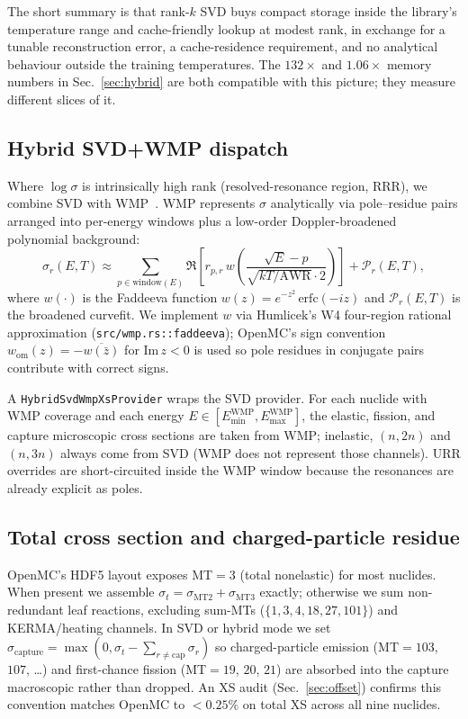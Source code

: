 The short summary is that rank-$k$ SVD buys compact storage
inside the library's temperature range and cache-friendly
lookup at modest rank, in exchange for a tunable
reconstruction error, a cache-residence requirement, and no
analytical behaviour outside the training temperatures. The
$132\times$ and $1.06\times$ memory numbers in
Sec.~\ref{sec:hybrid} are both compatible with this picture;
they measure different slices of it.

\subsection{Hybrid SVD+WMP dispatch}

Where $\log \sigma$ is intrinsically high rank
(resolved-resonance region, RRR), we combine SVD with
WMP~\cite{josey2015wmp,forget2014wmp}. WMP represents $\sigma$
analytically via pole--residue pairs arranged into per-energy
windows plus a low-order Doppler-broadened polynomial
background:
\begin{equation}
\sigma_r(E, T) \approx \sum_{p \in \text{window}(E)}
\Re\!\left[
r_{p,r}\,
w\!\left(\frac{\sqrt{E} - p}{\sqrt{kT/\text{AWR}}\cdot 2}\right)
\right] + \mathcal{P}_r(E, T),
\end{equation}
where $w(\cdot)$ is the Faddeeva function
$w(z) = e^{-z^2}\,\mathrm{erfc}(-iz)$ and $\mathcal{P}_r(E, T)$
is the broadened curvefit. We implement $w$ via Humlicek's W4
four-region rational approximation
(\texttt{src/wmp.rs::faddeeva}); OpenMC's sign convention
$w_\text{om}(z) = -\overline{w(\bar z)}$ for
$\mathrm{Im}\,z < 0$ is used so pole residues in conjugate
pairs contribute with correct signs.

A \texttt{HybridSvdWmpXsProvider} wraps the SVD provider. For
each nuclide with WMP coverage and each energy $E \in
[E_\text{min}^\text{WMP}, E_\text{max}^\text{WMP}]$, the
elastic, fission, and capture microscopic cross sections are
taken from WMP; inelastic, $(n,2n)$ and $(n,3n)$ always come
from SVD (WMP does not represent those channels). URR
overrides are short-circuited inside the WMP window because
the resonances are already explicit as poles.

\subsection{Total cross section and charged-particle residue}
\label{sec:total_xs}

OpenMC's HDF5 layout exposes MT$=3$ (total nonelastic) for
most nuclides. When present we assemble $\sigma_t =
\sigma_\text{MT2} + \sigma_\text{MT3}$ exactly; otherwise we
sum non-redundant leaf reactions, excluding sum-MTs
($\{1, 3, 4, 18, 27, 101\}$) and KERMA/heating channels. In
SVD or hybrid mode we set $\sigma_\text{capture} = \max(0,
\sigma_t - \sum_{r \neq \text{cap}} \sigma_r)$ so
charged-particle emission (MT$=103$, $107$, \ldots) and
first-chance fission (MT$=19$, $20$, $21$) are absorbed into
the capture macroscopic rather than dropped. An XS audit
(Sec.~\ref{sec:offset}) confirms this convention matches
OpenMC to $<\!0.25\%$ on total XS across all nine nuclides.

